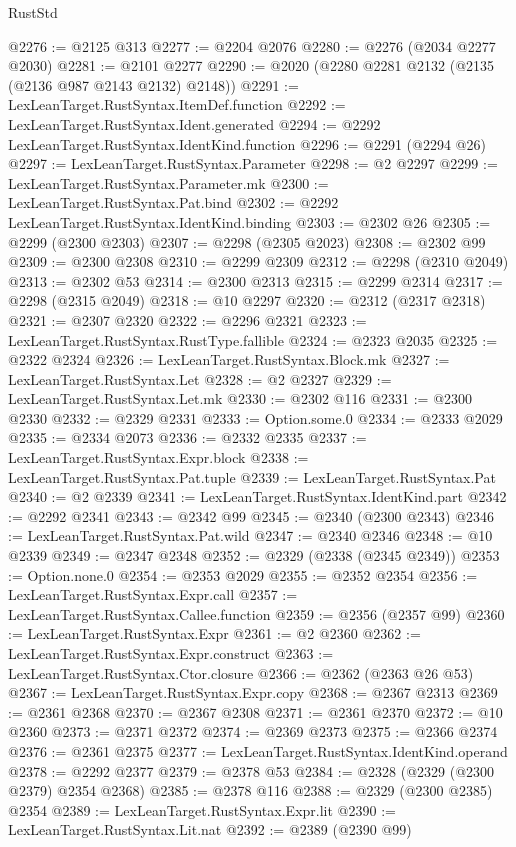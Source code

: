 \begin{lexlean}{RustStd}
\begin{coremodule}
@2276 := @2125 @313
@2277 := @2204 @2076
@2280 := @2276 (@2034 @2277 @2030)
@2281 := @2101 @2277
@2290 := @2020 (@2280 @2281 @2132 (@2135 (@2136 @987 @2143 @2132) @2148))
@2291 := LexLeanTarget.RustSyntax.ItemDef.function
@2292 := LexLeanTarget.RustSyntax.Ident.generated
@2294 := @2292 LexLeanTarget.RustSyntax.IdentKind.function
@2296 := @2291 (@2294 @26)
@2297 := LexLeanTarget.RustSyntax.Parameter
@2298 := @2 @2297
@2299 := LexLeanTarget.RustSyntax.Parameter.mk
@2300 := LexLeanTarget.RustSyntax.Pat.bind
@2302 := @2292 LexLeanTarget.RustSyntax.IdentKind.binding
@2303 := @2302 @26
@2305 := @2299 (@2300 @2303)
@2307 := @2298 (@2305 @2023)
@2308 := @2302 @99
@2309 := @2300 @2308
@2310 := @2299 @2309
@2312 := @2298 (@2310 @2049)
@2313 := @2302 @53
@2314 := @2300 @2313
@2315 := @2299 @2314
@2317 := @2298 (@2315 @2049)
@2318 := @10 @2297
@2320 := @2312 (@2317 @2318)
@2321 := @2307 @2320
@2322 := @2296 @2321
@2323 := LexLeanTarget.RustSyntax.RustType.fallible
@2324 := @2323 @2035
@2325 := @2322 @2324
@2326 := LexLeanTarget.RustSyntax.Block.mk
@2327 := LexLeanTarget.RustSyntax.Let
@2328 := @2 @2327
@2329 := LexLeanTarget.RustSyntax.Let.mk
@2330 := @2302 @116
@2331 := @2300 @2330
@2332 := @2329 @2331
@2333 := Option.some.{0}
@2334 := @2333 @2029
@2335 := @2334 @2073
@2336 := @2332 @2335
@2337 := LexLeanTarget.RustSyntax.Expr.block
@2338 := LexLeanTarget.RustSyntax.Pat.tuple
@2339 := LexLeanTarget.RustSyntax.Pat
@2340 := @2 @2339
@2341 := LexLeanTarget.RustSyntax.IdentKind.part
@2342 := @2292 @2341
@2343 := @2342 @99
@2345 := @2340 (@2300 @2343)
@2346 := LexLeanTarget.RustSyntax.Pat.wild
@2347 := @2340 @2346
@2348 := @10 @2339
@2349 := @2347 @2348
@2352 := @2329 (@2338 (@2345 @2349))
@2353 := Option.none.{0}
@2354 := @2353 @2029
@2355 := @2352 @2354
@2356 := LexLeanTarget.RustSyntax.Expr.call
@2357 := LexLeanTarget.RustSyntax.Callee.function
@2359 := @2356 (@2357 @99)
@2360 := LexLeanTarget.RustSyntax.Expr
@2361 := @2 @2360
@2362 := LexLeanTarget.RustSyntax.Expr.construct
@2363 := LexLeanTarget.RustSyntax.Ctor.closure
@2366 := @2362 (@2363 @26 @53)
@2367 := LexLeanTarget.RustSyntax.Expr.copy
@2368 := @2367 @2313
@2369 := @2361 @2368
@2370 := @2367 @2308
@2371 := @2361 @2370
@2372 := @10 @2360
@2373 := @2371 @2372
@2374 := @2369 @2373
@2375 := @2366 @2374
@2376 := @2361 @2375
@2377 := LexLeanTarget.RustSyntax.IdentKind.operand
@2378 := @2292 @2377
@2379 := @2378 @53
@2384 := @2328 (@2329 (@2300 @2379) @2354 @2368)
@2385 := @2378 @116
@2388 := @2329 (@2300 @2385) @2354
@2389 := LexLeanTarget.RustSyntax.Expr.lit
@2390 := LexLeanTarget.RustSyntax.Lit.nat
@2392 := @2389 (@2390 @99)

\end{coremodule}
\end{lexlean}
